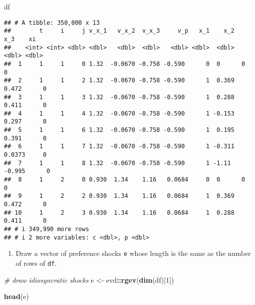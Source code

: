 \documentclass[
]{book}
\newenvironment{Shaded}{\begin{snugshade}}{\end{snugshade}}
\newcommand{\CommentTok}[1]{\textcolor[rgb]{0.56,0.35,0.01}{\textit{#1}}}
\newcommand{\DecValTok}[1]{\textcolor[rgb]{0.00,0.00,0.81}{#1}}
\newcommand{\FunctionTok}[1]{\textcolor[rgb]{0.13,0.29,0.53}{\textbf{#1}}}
\newcommand{\NormalTok}[1]{#1}
\newcommand{\OtherTok}[1]{\textcolor[rgb]{0.56,0.35,0.01}{#1}}
\newcommand{\SpecialCharTok}[1]{\textcolor[rgb]{0.81,0.36,0.00}{\textbf{#1}}}
\providecommand{\tightlist}{%
  \setlength{\itemsep}{0pt}\setlength{\parskip}{0pt}}
\begin{document}
\begin{Shaded}
\begin{Highlighting}[]
\NormalTok{df}
\end{Highlighting}
\end{Shaded}

\begin{verbatim}
## # A tibble: 350,000 x 13
##        t     i     j v_x_1   v_x_2  v_x_3     v_p   x_1    x_2     x_3    xi
##    <int> <int> <dbl> <dbl>   <dbl>  <dbl>   <dbl> <dbl>  <dbl>   <dbl> <dbl>
##  1     1     1     0 1.32  -0.0670 -0.758 -0.590      0  0      0          0
##  2     1     1     2 1.32  -0.0670 -0.758 -0.590      1  0.369  0.472      0
##  3     1     1     3 1.32  -0.0670 -0.758 -0.590      1  0.288  0.411      0
##  4     1     1     4 1.32  -0.0670 -0.758 -0.590      1 -0.153  0.297      0
##  5     1     1     6 1.32  -0.0670 -0.758 -0.590      1  0.195  0.391      0
##  6     1     1     7 1.32  -0.0670 -0.758 -0.590      1 -0.311  0.0373     0
##  7     1     1     8 1.32  -0.0670 -0.758 -0.590      1 -1.11  -0.995      0
##  8     1     2     0 0.930  1.34    1.16   0.0684     0  0      0          0
##  9     1     2     2 0.930  1.34    1.16   0.0684     1  0.369  0.472      0
## 10     1     2     3 0.930  1.34    1.16   0.0684     1  0.288  0.411      0
## # i 349,990 more rows
## # i 2 more variables: c <dbl>, p <dbl>
\end{verbatim}

\begin{enumerate}
\def\labelenumi{\arabic{enumi}.}
\setcounter{enumi}{5}
\tightlist
\item
  Draw a vector of preference shocks \texttt{e} whose length is the same as the number of rows of \texttt{df}.
\end{enumerate}

\begin{Shaded}
\begin{Highlighting}[]
\CommentTok{\# draw idiosyncratic shocks}
\NormalTok{e }\OtherTok{\textless{}{-}}\NormalTok{ evd}\SpecialCharTok{::}\FunctionTok{rgev}\NormalTok{(}\FunctionTok{dim}\NormalTok{(df)[}\DecValTok{1}\NormalTok{])}
\end{Highlighting}
\end{Shaded}

\begin{Shaded}
\begin{Highlighting}[]
\FunctionTok{head}\NormalTok{(e)}
\end{Highlighting}
\end{Shaded}
\end{document}
